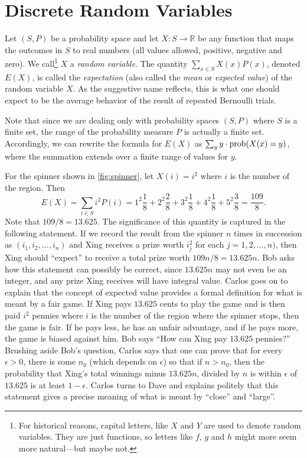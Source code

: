 \section{Discrete Random Variables}\label{s:probability:discrete-random-variables}

Let $(S,P)$ be a probability space and let
$X:S\longrightarrow\mathbb{R}$ be any function that maps the outcomes
in $S$ to real numbers (all values allowed, positive, negative and
zero).  We call\footnote{For historical reasons, capital letters, like
  $X$ and $Y$ are used to denote random variables.  They are just
  functions, so letters like $f$, $g$ and $h$ might more seem more
  natural---but maybe not.} $X$ a \textit{random variable}.  The
quantity $\sum_{x\in S} X(x)P(x)$, denoted $E(X)$, is called the
\textit{expectation} (also called the \textit{mean} or \emph{expected
  value}) of the random variable $X$.  As the suggestive name
reflects, this is what one should expect to be the average behavior of
the result of repeated Bernoulli trials.

Note that since we are dealing only with probability spaces $(S,P)$ where
$S$ is a finite set, the range of the probability measure $P$ is actually
a finite set.  Accordingly, we can rewrite the formula for $E(X)$ as 
$\sum_y y\cdot \operatorname{prob}(X(x)=y)$, where the summation extends over a finite
range of values for $y$.

\begin{example}
For the spinner shown in \autoref{fig:spinner}, let $X(i)=i^2$ where
$i$ is the number of the region.  Then 
\[
E(X)=\sum_{i\in S} i^2P(i)=1^2\frac{1}{8}+2^2\frac{2}{8}+3^2\frac{1}{8}+
   4^2\frac{1}{8}+5^2\frac{3}{8}=\frac{109}{8}.
\]
Note that $109/8=13.625$.  The significance of this quantity is
captured in the following statement.  If we record the result from the
spinner $n$ times in succession as $(i_1,i_2,\dots,i_n)$ and Xing
receives a prize worth $i_j^2$ for each $j=1,2,\dots,n)$, then Xing
should ``expect'' to receive a total prize worth $109n/8=13.625n$.
Bob asks how this statement can possibly be correct, since $13.625n$
may not even be an integer, and any prize Xing receives will have
integral value.  Carlos goes on to explain that the concept of
expected value provides a formal definition for what is meant by a
fair game.  If Xing pays $13.625$ cents to play the game and is then
paid $i^2$ pennies where $i$ is the number of the region where the
spinner stops, then the game is fair.  If he pays less, he has an
unfair advantage, and if he pays more, the game is biased against him.
Bob says ``How can Xing pay $13.625$ pennies?''  Brushing aside Bob's
question, Carlos says that one can prove that for every $\epsilon >0$,
there is some $n_0$ (which depends on $\epsilon$) so that if $n>n_0$,
then the probability that Xing's total winnings minus $13.625n$,
divided by $n$ is within $\epsilon$ of $13.625$ is at least
$1-\epsilon$.  Carlos turns to Dave and explains politely that this
statement gives a precise meaning of what is meant by ``close'' and
``large''.
\end{example}

